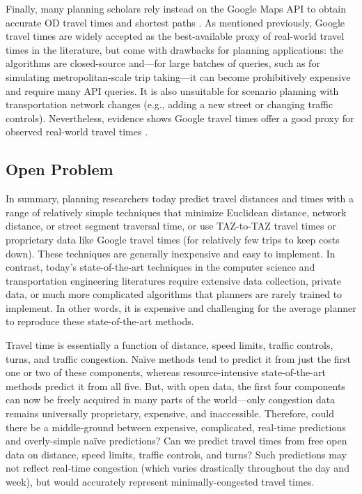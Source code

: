 \documentclass[12pt,letterpaper]{article} %
\begin{document}
Finally, many planning scholars rely instead on the Google Maps API to obtain accurate OD travel times and shortest paths \citep[e.g.,][]{fielbaum2021assessment,costa2021spatial, swayne2021integrating,hu2020estimating,cuervo2022dynamic,chen2020communities,hwang2024measuring}. As mentioned previously, Google travel times are widely accepted as the best-available proxy of real-world travel times in the literature, but come with drawbacks for planning applications: the algorithms are closed-source and---for large batches of queries, such as for simulating metropolitan-scale trip taking---it can become prohibitively expensive and require many API queries. It is also unsuitable for scenario planning with transportation network changes (e.g., adding a new street or changing traffic controls). Nevertheless, evidence shows Google travel times offer a good proxy for observed real-world travel times \citep{lin2021impact,fu2023comparative,alsobky2020estimating,wang2011estimating,wu2019comparing}.

\subsection{Open Problem}\label{sec:problem}

In summary, planning researchers today predict travel distances and times with a range of relatively simple techniques that minimize Euclidean distance, network distance, or street segment traversal time, or use TAZ-to-TAZ travel times or proprietary data like Google travel times (for relatively few trips to keep costs down). These techniques are generally inexpensive and easy to implement. In contrast, today's state-of-the-art techniques in the computer science and transportation engineering literatures require extensive data collection, private data, or much more complicated algorithms that planners are rarely trained to implement. In other words, it is expensive and challenging for the average planner to reproduce these state-of-the-art methods.

Travel time is essentially a function of distance, speed limits, traffic controls, turns, and traffic congestion. Naïve methods tend to predict it from just the first one or two of these components, whereas resource-intensive state-of-the-art methods predict it from all five. But, with open data, the first four components can now be freely acquired in many parts of the world---only congestion data remains universally proprietary, expensive, and inaccessible. Therefore, could there be a middle-ground between expensive, complicated, real-time predictions and overly-simple naïve predictions? Can we predict travel times from free open data on distance, speed limits, traffic controls, and turns? Such predictions may not reflect real-time congestion (which varies drastically throughout the day and week), but would accurately represent minimally-congested travel times.
\end{document}
